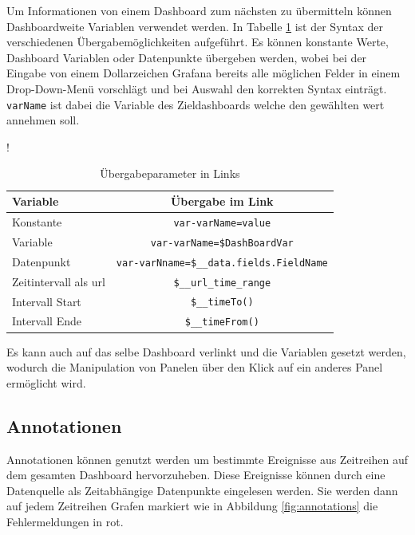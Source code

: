\documentclass[a4paper, 12pt, oneside]{scrbook}
\begin{document}
		\noindent Um Informationen von einem Dashboard zum nächsten zu übermitteln können Dashboardweite Variablen verwendet werden. In Tabelle \ref{tab:links} ist der Syntax der verschiedenen Übergabemöglichkeiten aufgeführt. Es können konstante Werte, Dashboard Variablen oder Datenpunkte übergeben werden, wobei bei der Eingabe von einem Dollarzeichen Grafana bereits alle möglichen Felder in einem Drop-Down-Menü vorschlägt und bei Auswahl den korrekten Syntax einträgt. \texttt{varName} ist dabei die Variable des Zieldashboards welche den gewählten wert annehmen soll.
			 
		\begin{table} [H]
			\centering
			\resizebox{\linewidth} {!} {
	 		\begin{tabular}[h]{|l|c|}
	 			\hline
	 			Variable & Übergabe im Link \\
	 			\hline
	 			Konstante & \texttt{var-varName=value} \\
	 			\hline
	 			Variable &  \texttt{var-varName=\${DashBoardVar}} \\
	 			\hline
	 			Datenpunkt &  \texttt{var-varNname=\${\_\_data.fields.FieldName}} \\
	 			\hline
	 			Zeitintervall als url &  \texttt{\${\_\_url\_time\_range}} \\
	 			Intervall Start& \texttt{\$\_\_timeTo()} \\
	 			Intervall Ende& \texttt{\$\_\_timeFrom()} \\
	 			\hline
	 		\end{tabular}
		}
		 		
	 	\caption{Übergabeparameter in Links}
	 	\label{tab:links}
	\end{table}
		 
	\noindent Es kann auch auf das selbe Dashboard verlinkt und die Variablen gesetzt werden, wodurch die Manipulation von Panelen über den Klick auf ein anderes Panel ermöglicht wird.
			 
			 
	\subsection{Annotationen}
			 
	\noindent Annotationen können genutzt werden um bestimmte Ereignisse aus Zeitreihen auf dem gesamten Dashboard hervorzuheben. Diese Ereignisse können durch eine Datenquelle als Zeitabhängige Datenpunkte eingelesen werden. Sie werden dann auf jedem Zeitreihen Grafen markiert wie in Abbildung \ref{fig:annotations} die Fehlermeldungen in rot.
		 
\end{document}
